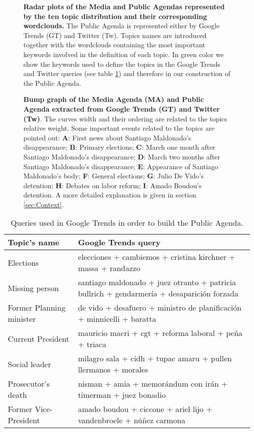 \documentclass[10pt,letterpaper]{article}
\begin{document}
\begin{figure}[!h]
\centering
\caption{\textbf{Radar plots of the Media and Public Agendas represented by the ten topic distribution and their corresponding wordclouds.} The Public Agenda is represented either by Google Trends (GT) and Twitter (Tw). 
Topics names are introduced together with the wordclouds containing the most important keywords involved in the definition of each topic. In green color we show the keywords used to define the topics in the Google Trends and Twitter queries (see table \ref{table:gt_queries}) and therefore in our construction of the Public Agenda.}
\label{fig:topics_wordclouds}
\end{figure}


\begin{figure}[!h]
\caption{\textbf{Bump graph of the Media Agenda (MA) and Public Agenda extracted from Google Trends (GT) and Twitter (Tw)}. The curves width and their ordering are related to the topics relative weight. Some important events related to the topics are pointed out:
\textbf{A}: First news about Santiago Maldonado's disappearance;
\textbf{B}: Primary elections;
\textbf{C}: March one month after Santiago Maldonado's disappearance;
\textbf{D}: March two months after Santiago Maldonado's disappearance;
\textbf{E}: Appearance of Santiago Maldonado's body;
\textbf{F}: General elections;
\textbf{G}: Julio De Vido's detention;
\textbf{H}: Debates on labor reform;
\textbf{I}: Amado Boudou's detention.
A more detailed explanation is given in section \ref{sec:Context}.}
\label{fig:all_agenda}
\end{figure}


\begin{table}[!h]
\begin{adjustwidth}{-2.25in}{0in}
\begin{tabular}{ll}
Topic's name & Google Trends query \\ \hline
Elections & elecciones + cambiemos + cristina kirchner + massa + randazzo \\
Missing person & santiago maldonado + juez otranto + patricia bullrich + gendarmería + desaparici\'on forzada \\
Former Planning minister & de vido + desafuero + ministro de planificaci\'on + minnicelli + baratta \\
Current President & mauricio macri + cgt + reforma laboral + peña + triaca \\
Social leader & milagro sala + cidh + tupac amaru + pullen llermanos + morales \\
Prosecutor's death & nisman + amia + memor\'andum con ir\'an + timerman + juez bonadio \\
Former Vice-President & amado boudou + ciccone + ariel lijo + vandenbroele + núñez carmona \\
\end{tabular}
\caption{Queries used in Google Trends in order to build the Public Agenda.}
\label{table:gt_queries}
\end{adjustwidth}
\end{table}
\end{document}
